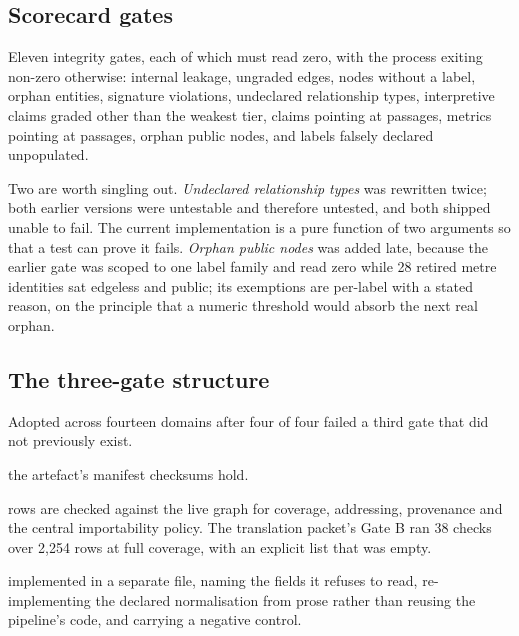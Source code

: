 \subsection{Scorecard gates}

Eleven integrity gates, each of which must read zero, with the process exiting
non-zero otherwise: internal leakage, ungraded edges, nodes without a label, orphan
entities, signature violations, undeclared relationship types, interpretive claims
graded other than the weakest tier, claims pointing at passages, metrics pointing at
passages, orphan public nodes, and labels falsely declared unpopulated.

Two are worth singling out. \emph{Undeclared relationship types} was rewritten twice;
both earlier versions were untestable and therefore untested, and both shipped unable
to fail. The current implementation is a pure function of two arguments so that a
test can prove it fails. \emph{Orphan public nodes} was added late, because the
earlier gate was scoped to one label family and read zero while 28 retired metre
identities sat edgeless and public; its exemptions are per-label with a stated
reason, on the principle that a numeric threshold would absorb the next real orphan.

\subsection{The three-gate structure}

Adopted across fourteen domains after four of four failed a third gate that did not
previously exist.

\begin{description}[leftmargin=1.6em,itemsep=2pt,topsep=3pt,style=nextline]
\item[Gate A --- integrity] the artefact's manifest checksums hold.
\item[Gate B --- conformance] rows are checked against the live graph for coverage,
addressing, provenance and the central importability policy. The translation packet's
Gate B ran 38 checks over 2{,}254 rows at full coverage, with an explicit
 list that was empty.
\item[Gate C --- attack] implemented in a separate file, naming the fields it refuses
to read, re-implementing the declared normalisation from prose rather than reusing
the pipeline's code, and carrying a negative control.
\end{description}

